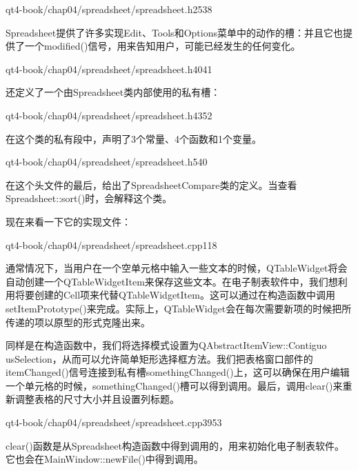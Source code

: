 \documentclass[11pt,oneside]{book}
\begin{document}
\begin{common-format}
\begin{cppline}{qt4-book/chap04/spreadsheet/spreadsheet.h}{25}{38}
\end{cppline}

Spreadsheet提供了许多实现Edit、Tools和Options菜单中的动作的槽：并且它也提供了一个modified()信号，用来告知用户，可能已经发生的任何变化。

\begin{cppline}{qt4-book/chap04/spreadsheet/spreadsheet.h}{40}{41}
\end{cppline}

还定义了一个由Spreadsheet类内部使用的私有槽： 

\begin{cppline}{qt4-book/chap04/spreadsheet/spreadsheet.h}{43}{52}
\end{cppline}

在这个类的私有段中，声明了3个常量、4个函数和1个变量。

\begin{cppline}{qt4-book/chap04/spreadsheet/spreadsheet.h}{54}{0}
\end{cppline}

在这个头文件的最后，给出了SpreadsheetCompare类的定义。当查看Spreadsheet::sort()时，会解释这个类。

现在来看一下它的实现文件：

\begin{cppline}{qt4-book/chap04/spreadsheet/spreadsheet.cpp}{1}{18}
\end{cppline}

通常情况下，当用户在一个空单元格中输入一些文本的时候，QTableWidget将会自动创建一个QTableWidgetItem来保存这些文本。在电子制表软件中，我们想利用将要创建的Cell项来代替QTableWidgetItem。这可以通过在构造函数中调用setItemPrototype()来完成。实际上，QTableWidget会在每次需要新项的时候把所传递的项以原型的形式克隆出来。

同样是在构造函数中，我们将选择模式设置为QAbstractItemView::Contiguo\\ usSelection，从而可以允许简单矩形选择框方法。我们把表格窗口部件的itemChanged()信号连接到私有槽somethingChanged()上，这可以确保在用户编辑一个单元格的时候，somethingChanged()槽可以得到调用。最后，调用clear()来重新调整表格的尺寸大小并且设置列标题。

\begin{cppline}{qt4-book/chap04/spreadsheet/spreadsheet.cpp}{39}{53}
\end{cppline}

clear()函数是从Spreadsheet构造函数中得到调用的，用来初始化电子制表软件。它也会在MainWindow::newFile()中得到调用。
 

\end{common-format}
\end{document}
